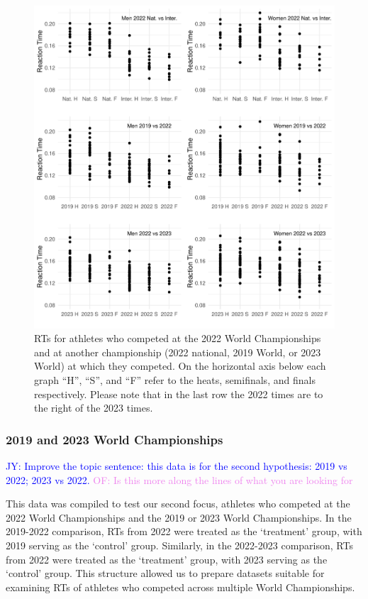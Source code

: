 \documentclass[12pt, letterpaper]{article}
\newcommand{\jy}[1]{\textcolor{blue}{JY: #1}}
\newcommand{\of}[1]{\textcolor{violet}{OF: #1}}
\begin{document}
\begin{figure}[tbp]
  \centering
  \includegraphics[width=\textwidth]{RankScatterPlots}
  \caption{RTs for athletes who competed at the 2022 World Championships
    and at another championship (2022 national, 2019 World, or 2023
    World) at which they competed. On the horizontal
    axis below each graph ``H'', ``S'', and ``F'' refer to the heats,
    semifinals, and  finals respectively. Please note that in the last
    row the 2022 times are to the right of the 2023 times.}
  \label{fig:RankScatterplots}
\end{figure}

\subsubsection{2019 and 2023 World Championships}
\label{sec:data2019}

\jy{Improve the topic sentence: this data is for the second
  hypothesis: 2019 vs 2022; 2023 vs 2022.}
\of{Is this more along the lines of what you are looking for}

This data was compiled to test our second focus, athletes who competed at
the 2022 World Championships and the 2019 or 2023 World Championships. 
In the 2019-2022 comparison,
RTs from 2022 were treated as the `treatment' group, with
2019 serving as the `control' group. Similarly, in the 2022-2023
comparison, RTs from 2022 were treated as the `treatment'
group, with 2023 serving as the `control' group. This structure allowed
us to prepare datasets suitable for examining RTs of athletes
who competed across multiple World Championships.
\end{document}
